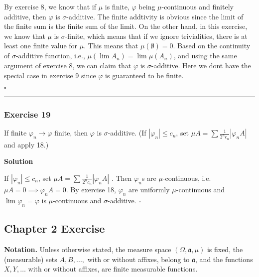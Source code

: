 \documentclass[
]{article}
\begin{document}
By exercise 8, we know that if \(\mu\) is finite, \(\varphi\) being
\(\mu\)-continuous and finitely additive, then \(\varphi\) is
\(\sigma\)-additive. The finite addtivity is obvious since the limit of
the finite sum is the finite sum of the limit. On the other hand, in
this exercise, we know that \(\mu\) is \(\sigma\)-finite, which means
that if we ignore trivialities, there is at least one finite value for
\(\mu\). This means that \(\mu(\emptyset) = 0\). Based on the continuity
of \(\sigma\)-additive function, i.e.,
\(\mu(\lim A_n) = \lim \mu(A_n)\), and using the same argument of
exercise 8, we can claim that \(\varphi\) is \(\sigma\)-additive. Here
we don\textquotesingle t have the special case in exercise 9 since
\(\varphi\) is guaranteed to be finite.

\(\square\)

\begin{center}\rule{0.5\linewidth}{0.5pt}\end{center}

\hypertarget{exercise-19}{%
  \subsubsection{Exercise 19}\label{exercise-19}}

If finite \(\varphi_n \rightarrow \varphi\) finite, then \(\varphi\) is
\(\sigma\)-additive. (If \(\left|\varphi_n\right| \le c_n\), set
\(\mu A=\sum \frac{1}{2^n c_n}\left|\varphi_n A\right|\) and apply 18.)

\textbf{Solution}

If \(\left|\varphi_n\right| \le c_n\), set
\(\mu A=\sum \frac{1}{2^n c_n}\left|\varphi_n A\right|\) . Then
\(\varphi_n\)\textquotesingle s are \(\mu\)-continuous, i.e.
\(\mu A = 0 \implies \varphi_n A = 0\). By exercise 18, \(\varphi_n\)
are uniformly \(\mu\)-continuous and \(\lim \varphi_n=\varphi\) is
\(\mu\)-continuous and \(\sigma\)-additive. \(\square\)

\hypertarget{chapter-2-exercise}{%
  \subsection{Chapter 2 Exercise}\label{chapter-2-exercise}}

\textbf{Notation.} Unless otherwise stated, the measure space
\((\Omega,\mathfrak a, \mu)\) is fixed, the (measurable) sets
\(A, B, ...,\) with or without affixes, belong to \(\mathfrak a\), and
the functions \(X, Y, \dots\) with or without affixes, are finite
measurable functions.
\end{document}
